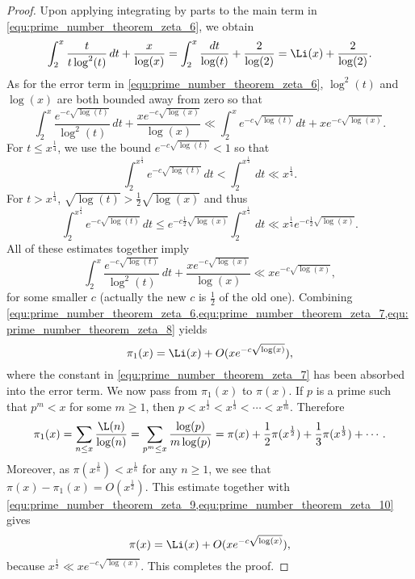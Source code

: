 \begin{proof}
        Upon applying integrating by parts to the main term in \cref{equ:prime_number_theorem_zeta_6}, we obtain
        \begin{equation}\label{equ:prime_number_theorem_zeta_7}
          \int_{2}^{x}\frac{t}{t\log^{2}(t)}\,dt+\frac{x}{\log(x)} = \int_{2}^{x}\frac{dt}{\log(t)}+\frac{2}{\log(2)} = \Li(x)+\frac{2}{\log(2)}.
        \end{equation}
        As for the error term in \cref{equ:prime_number_theorem_zeta_6}, $\log^{2}(t)$ and $\log(x)$ are both bounded away from zero so that
        \[
          \int_{2}^{x}\frac{e^{-c\sqrt{\log(t)}}}{\log^{2}(t)}\,dt+\frac{xe^{-c\sqrt{\log(x)}}}{\log(x)} \ll \int_{2}^{x}e^{-c\sqrt{\log(t)}}\,dt+xe^{-c\sqrt{\log(x)}}.
        \]
        For $t \le x^{\frac{1}{4}}$, we use the bound $e^{-c\sqrt{\log(t)}} < 1$ so that
        \[
          \int_{2}^{x^{\frac{1}{4}}}e^{-c\sqrt{\log(t)}}\,dt < \int_{2}^{x^{\frac{1}{4}}}\,dt \ll x^{\frac{1}{4}}.
        \]
        For $t > x^{\frac{1}{4}}$, $\sqrt{\log(t)} > \frac{1}{2}\sqrt{\log(x)}$ and thus
        \[
          \int_{2}^{x^{\frac{1}{4}}}e^{-c\sqrt{\log(t)}}\,dt \le e^{-c\frac{1}{2}\sqrt{\log(x)}}\int_{2}^{x^{\frac{1}{4}}}\,dt \ll x^{\frac{1}{4}}e^{-c\frac{1}{2}\sqrt{\log(x)}}. 
        \]
        All of these estimates together imply
        \begin{equation}\label{equ:prime_number_theorem_zeta_8}
          \int_{2}^{x}\frac{e^{-c\sqrt{\log(t)}}}{\log^{2}(t)}\,dt+\frac{xe^{-c\sqrt{\log(x)}}}{\log(x)} \ll xe^{-c\sqrt{\log(x)}},
        \end{equation}
        for some smaller $c$ (actually the new $c$ is $\frac{1}{2}$ of the old one). Combining \cref{equ:prime_number_theorem_zeta_6,equ:prime_number_theorem_zeta_7,equ:prime_number_theorem_zeta_8} yields
        \begin{equation}\label{equ:prime_number_theorem_zeta_9}
          \pi_{1}(x) = \Li(x)+O(xe^{-c\sqrt{\log(x)}}),
        \end{equation}
        where the constant in \cref{equ:prime_number_theorem_zeta_7} has been absorbed into the error term. We now pass from $\pi_{1}(x)$ to $\pi(x)$. If $p$ is a prime such that $p^{m} < x$ for some $m \ge 1$, then $p < x^{\frac{1}{2}} < x^{\frac{1}{3}} < \cdots < x^{\frac{1}{m}}$. Therefore
        \begin{equation}\label{equ:prime_number_theorem_zeta_10}
          \pi_{1}(x) = \sum_{n \le x}\frac{\L(n)}{\log(n)} = \sum_{p^{m} \le x}\frac{\log(p)}{m\log(p)} = \pi(x)+\frac{1}{2}\pi(x^{\frac{1}{2}})+\frac{1}{3}\pi(x^{\frac{1}{3}})+\cdots.
        \end{equation}
        Moreover, as $\pi(x^{\frac{1}{n}}) < x^{\frac{1}{n}}$ for any $n \ge 1$, we see that $\pi(x)-\pi_{1}(x) = O(x^{\frac{1}{2}})$. This estimate together with \cref{equ:prime_number_theorem_zeta_9,equ:prime_number_theorem_zeta_10} gives
        \[
          \pi(x) = \Li(x)+O(xe^{-c\sqrt{\log(x)}}),
        \]
        because $x^{\frac{1}{2}} \ll xe^{-c\sqrt{\log(x)}}$. This completes the proof.
      \end{proof}

